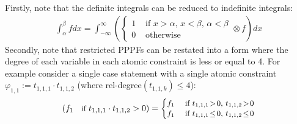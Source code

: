 \documentclass{article}
\newcommand{\case}[2]{#2 &\text{ if } #1}%
\newcommand{\otherwise}[1]{#1 &\text{ otherwise}}
\begin{document}
Firstly, note that the definite integrals can be reduced to indefinite integrals:
{
\footnotesize
\begin{align*}
\int_{\alpha}^{\beta} f dx  = 
\int_{-\infty}^{\infty}
\left (
  \begin{cases}
  \case{x\!>\!\alpha,\, x\!<\!\beta,\, \alpha \!<\! \beta}{1}\\
 \otherwise{0}    
  \end{cases}
\otimes
  f
\right)
dx
\end{align*}
}
Secondly, note that restricted PPPFs can be restated into a form where
the degree of each variable in each atomic constraint is less or equal to 4.
For example consider a single case statement with a single atomic constraint 
$\varphi_{1,1} := t_{1,1,1} \cdot t_{1,1,2}$ (where rel-degree$(t_{1,1,k})\leq4$):
\begin{align*}
{\footnotesize
\left(
f_1 \quad \text{if } t_{1,1,1} \cdot t_{1,1,2} > 0
\right)
 =
\begin{cases}
  \case{t_{1,1,1} \!>\! 0, \, t_{1,1,2} \!>\! 0 }{f_1} \\ 
  \case{t_{1,1,1} \!\leq\! 0, \, t_{1,1,2} \!\leq\! 0 }{f_1} 
 \end{cases} 
}
\end{align*}
\end{document}
